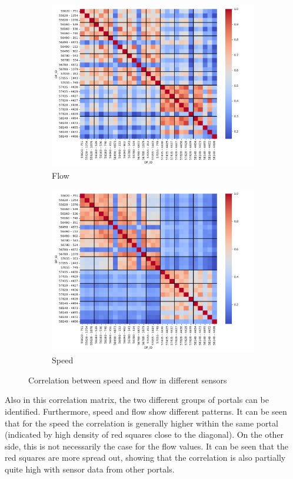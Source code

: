 	\begin{figure}[p]
		\centering
		\begin{subfigure}{0.9 \linewidth}
			\includegraphics[width=\textwidth]{../Plots/Flow/sensor_corr_by_portal}
			\caption{Flow}
		\end{subfigure}
		\begin{subfigure}{0.9 \linewidth}
			\includegraphics[width=\textwidth]{../Plots/Speed/sensor_corr_by_portal}
			\caption{Speed}
		\end{subfigure}
		\caption{Correlation between speed and flow in different sensors}
		\label{fig:sensor_corr_by_portal}
	\end{figure}
	\noindent Also in this correlation matrix, the two different groups of portals can be identified.
	Furthermore, speed and flow show different patterns. It can be seen that for the speed the correlation is generally higher within the same portal (indicated by high density of red squares close to the diagonal). On the other side, this is not necessarily the case for the flow values. It can be seen that the red squares are more spread out, showing that the correlation is also partially quite high with sensor data from other portals.
